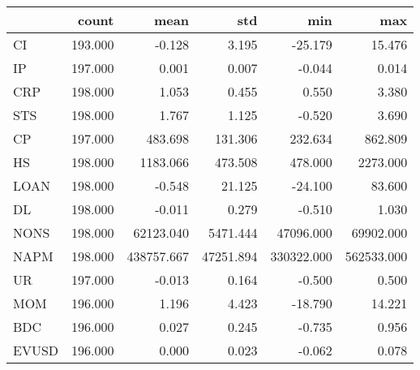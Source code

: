 \begin{tabular}{lrrrrr}
\toprule
{} &   count &       mean &       std &        min &        max \\
\midrule
CI    & 193.000 &     -0.128 &     3.195 &    -25.179 &     15.476 \\
IP    & 197.000 &      0.001 &     0.007 &     -0.044 &      0.014 \\
CRP   & 198.000 &      1.053 &     0.455 &      0.550 &      3.380 \\
STS   & 198.000 &      1.767 &     1.125 &     -0.520 &      3.690 \\
CP    & 197.000 &    483.698 &   131.306 &    232.634 &    862.809 \\
HS    & 198.000 &   1183.066 &   473.508 &    478.000 &   2273.000 \\
LOAN  & 198.000 &     -0.548 &    21.125 &    -24.100 &     83.600 \\
DL    & 198.000 &     -0.011 &     0.279 &     -0.510 &      1.030 \\
NONS  & 198.000 &  62123.040 &  5471.444 &  47096.000 &  69902.000 \\
NAPM  & 198.000 & 438757.667 & 47251.894 & 330322.000 & 562533.000 \\
UR    & 197.000 &     -0.013 &     0.164 &     -0.500 &      0.500 \\
MOM   & 196.000 &      1.196 &     4.423 &    -18.790 &     14.221 \\
BDC   & 196.000 &      0.027 &     0.245 &     -0.735 &      0.956 \\
EVUSD & 196.000 &      0.000 &     0.023 &     -0.062 &      0.078 \\
\bottomrule
\end{tabular}
